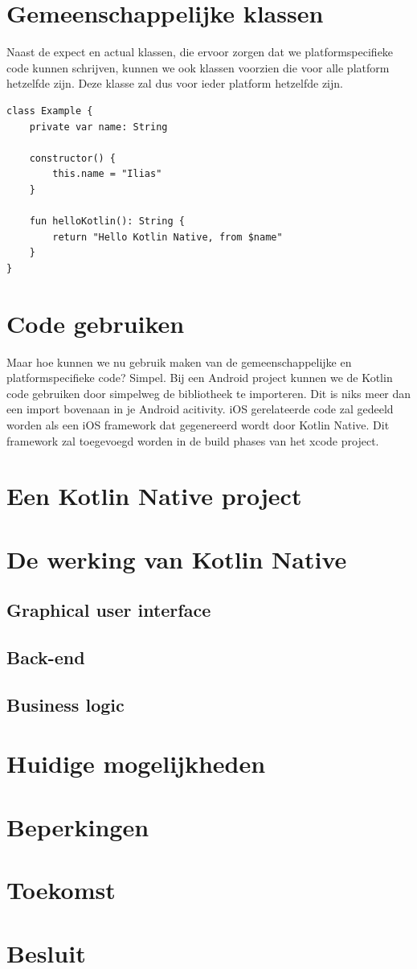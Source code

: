 \section{Gemeenschappelijke klassen}
Naast de expect en actual klassen, die ervoor zorgen dat we platformspecifieke code kunnen schrijven, kunnen we ook klassen voorzien die voor alle platform hetzelfde zijn. Deze klasse zal dus voor ieder platform hetzelfde zijn.

\begin{lstlisting}
class Example {
	private var name: String
	
	constructor() {
		this.name = "Ilias"
	}
	
	fun helloKotlin(): String {
		return "Hello Kotlin Native, from $name"
	}
}
\end{lstlisting}

\section {Code gebruiken}
Maar hoe kunnen we nu gebruik maken van de gemeenschappelijke en platformspecifieke code? Simpel. Bij een Android project kunnen we de Kotlin code gebruiken 
door simpelweg de bibliotheek te importeren. Dit is niks meer dan een import bovenaan in je Android acitivity. iOS gerelateerde code zal gedeeld worden als een iOS framework dat gegenereerd wordt door Kotlin Native. Dit framework zal toegevoegd worden in de build phases van het xcode project.

\section{Een Kotlin Native project}
\section{De werking van Kotlin Native}
\subsection{Graphical user interface}
\subsection{Back-end}
\subsection{Business logic}
\section{Huidige mogelijkheden}
\section{Beperkingen}
\section{Toekomst}
\section{Besluit}

